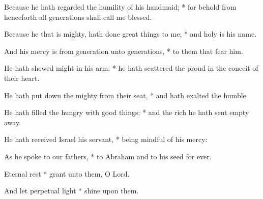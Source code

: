﻿\setcounter{enumi}{2}
\item  Because he hath regarded the humility of his handmaid; * for behold from henceforth all generations shall call me blessed.
\item  Because he that is mighty, hath done great things to me; * and holy is his name.
\item  And his mercy is from generation unto generations, * to them that fear him.
\item  He hath shewed might in his arm: * he hath scattered the proud in the conceit of their heart.
\item  He hath put down the mighty from their seat, * and hath exalted the humble.
\item  He hath filled the hungry with good things; * and the rich he hath sent empty away.
\item  He hath received Israel his servant, * being mindful of his mercy:
\item  As he spoke to our fathers, * to Abraham and to his seed for ever.
\item  Eternal rest * grant unto them, O Lord.
\item   And let perpetual light * shine upon them.